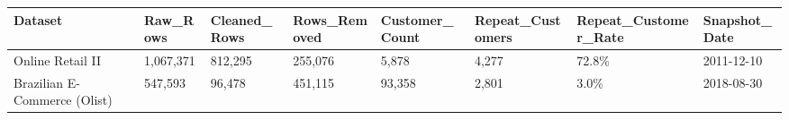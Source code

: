 \begin{tabular}{llllllll}
\toprule
Dataset & Raw\_Rows & Cleaned\_Rows & Rows\_Removed & Customer\_Count & Repeat\_Customers & Repeat\_Customer\_Rate & Snapshot\_Date \\
\midrule
Online Retail II & 1,067,371 & 812,295 & 255,076 & 5,878 & 4,277 & 72.8\% & 2011-12-10 \\
Brazilian E-Commerce (Olist) & 547,593 & 96,478 & 451,115 & 93,358 & 2,801 & 3.0\% & 2018-08-30 \\
\bottomrule
\end{tabular}
